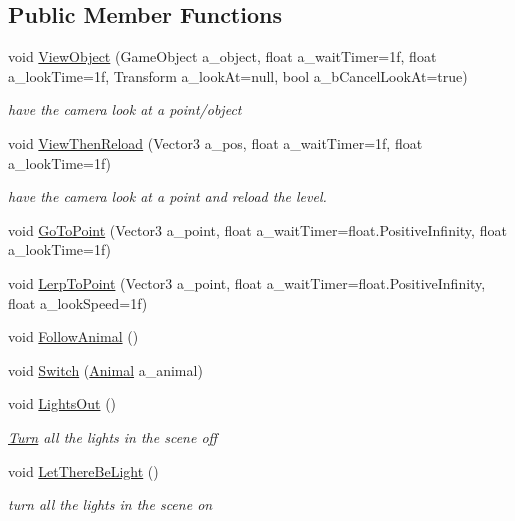 \subsection*{Public Member Functions}
\begin{DoxyCompactItemize}
\item 
void \mbox{\hyperlink{class_camera_controller_a5fac91ad6dfd73b67cbec8e427b4736e}{View\+Object}} (Game\+Object a\+\_\+object, float a\+\_\+wait\+Timer=1f, float a\+\_\+look\+Time=1f, Transform a\+\_\+look\+At=null, bool a\+\_\+b\+Cancel\+Look\+At=true)
\begin{DoxyCompactList}\small\item\em have the camera look at a point/object \end{DoxyCompactList}\item 
void \mbox{\hyperlink{class_camera_controller_a11f7d8c8c178433e5d3a54f62711ff37}{View\+Then\+Reload}} (Vector3 a\+\_\+pos, float a\+\_\+wait\+Timer=1f, float a\+\_\+look\+Time=1f)
\begin{DoxyCompactList}\small\item\em have the camera look at a point and reload the level. \end{DoxyCompactList}\item 
void \mbox{\hyperlink{class_camera_controller_a2720f41abfc672dea4fd3e386eb4e3fa}{Go\+To\+Point}} (Vector3 a\+\_\+point, float a\+\_\+wait\+Timer=float.\+Positive\+Infinity, float a\+\_\+look\+Time=1f)
\item 
void \mbox{\hyperlink{class_camera_controller_a90cd597ab3d5586711544b3f449eb68d}{Lerp\+To\+Point}} (Vector3 a\+\_\+point, float a\+\_\+wait\+Timer=float.\+Positive\+Infinity, float a\+\_\+look\+Speed=1f)
\item 
void \mbox{\hyperlink{class_camera_controller_a9b8ad016594f7b86daa8406f9f8fe31f}{Follow\+Animal}} ()
\item 
void \mbox{\hyperlink{class_camera_controller_ae466f73db5ef581ce90cb69f1f66605a}{Switch}} (\mbox{\hyperlink{class_animal}{Animal}} a\+\_\+animal)
\item 
void \mbox{\hyperlink{class_camera_controller_acebc21dbad7ad835eb72706bee190c77}{Lights\+Out}} ()
\begin{DoxyCompactList}\small\item\em \mbox{\hyperlink{class_turn}{Turn}} all the lights in the scene off \end{DoxyCompactList}\item 
void \mbox{\hyperlink{class_camera_controller_a66d5c10c02d5c08b89ad623afde6cdf2}{Let\+There\+Be\+Light}} ()
\begin{DoxyCompactList}\small\item\em turn all the lights in the scene on \end{DoxyCompactList}\end{DoxyCompactItemize}
